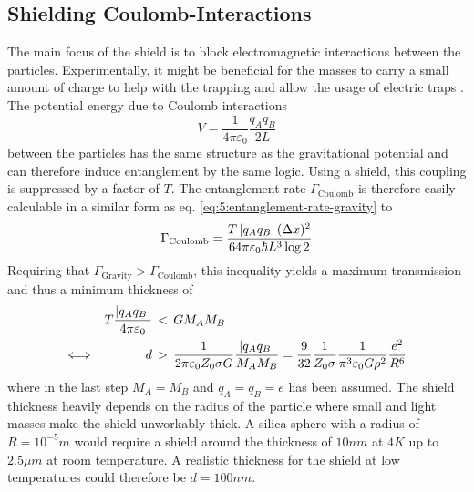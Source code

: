 \subsection{Shielding Coulomb-Interactions}
The main focus of the shield is to block electromagnetic interactions between the particles.
Experimentally, it might be beneficial for the masses to carry a small amount of charge to help with the trapping and allow the usage of electric traps \cite{GonzalezBallestero_2021}.
The potential energy due to Coulomb interactions
\begin{equation}
  V = \frac{1}{4\pi\varepsilon_0} \frac{q_A q_B}{2L}
\end{equation}
between the particles has the same structure as the gravitational potential and can therefore induce entanglement by the same logic.
Using a shield, this coupling is suppressed by a factor of $T$.
The entanglement rate $\Gamma_\mathrm{Coulomb}$ is therefore easily calculable in a similar form as eq. \eqref{eq:5:entanglement-rate-gravity} to
\begin{equation}\label{eq:5:entanglement-rate-coulomb}
  \Gamma_\mathrm{Coulomb} = \frac{T \left\lvert q_A q_B\right\rvert (\Delta x)^2}{64 \pi \varepsilon_0 \hbar L^3 \log 2}
\end{equation}
Requiring that $\Gamma_\mathrm{Gravity} > \Gamma_\mathrm{Coulomb}$, this inequality yields a maximum transmission and thus a minimum thickness of
\begin{align}\label{eq:5:coulomb-gravity-condition}
  T \frac{\left\lvert q_A q_B\right\rvert}{4 \pi \varepsilon_0} \, &< \, G M_A M_B \\
  \Longleftrightarrow \quad\quad\quad\quad d \, &> \, \frac{1}{2 \pi \varepsilon_0 Z_0 \sigma G} \frac{\left\lvert q_A q_B\right\rvert}{M_A M_B} = \frac{9}{32}\frac{1}{Z_0 \sigma} \frac{1}{\pi^3 \varepsilon_0 G \rho^2} \frac{e^2}{R^6}
\end{align}
where in the last step $M_A = M_B$ and $q_A = q_B = e$ has been assumed.
The shield thickness heavily depends on the radius of the particle where small and light masses make the shield unworkably thick.
A silica sphere with a radius of $R=10^{-5}\si{m}$ would require a shield around the thickness of $10\si{nm}$ at $4\si{K}$ up to $2.5\si{\mu m}$ at room temperature.
A realistic thickness for the shield at low temperatures could therefore be $d=100\si{nm}$.

